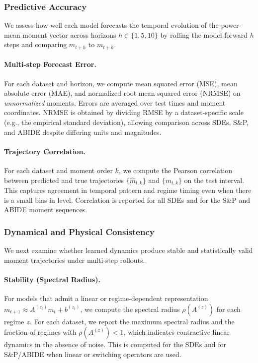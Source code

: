 \documentclass[journal, onecolumn]{IEEEtran}
\begin{document}
\subsubsection{Predictive Accuracy}

We assess how well each model forecasts the temporal evolution of the
power-mean moment vector across horizons \(h \in \{1,5,10\}\) by rolling the
model forward \(h\) steps and comparing \(\hat m_{t+h}\) to \(m_{t+h}\).

\paragraph{Multi-step Forecast Error.}
For each dataset and horizon, we compute mean squared error (MSE), mean
absolute error (MAE), and normalized root mean squared error (NRMSE) on
\emph{unnormalized} moments. Errors are averaged over test times and moment
coordinates. NRMSE is obtained by dividing RMSE by a dataset-specific scale
(e.g., the empirical standard deviation), allowing comparison across SDEs,
S\&P, and ABIDE despite differing units and magnitudes.

\paragraph{Trajectory Correlation.}
For each dataset and moment order \(k\), we compute the Pearson correlation
between predicted and true trajectories \(\{\hat m_{t,k}\}\) and
\(\{m_{t,k}\}\) on the test interval. This captures agreement in temporal
pattern and regime timing even when there is a small bias in level. Correlation
is reported for all SDEs and for the S\&P and ABIDE moment sequences.

\subsubsection{Dynamical and Physical Consistency}

We next examine whether learned dynamics produce stable and statistically valid
moment trajectories under multi-step rollouts.

\paragraph{Stability (Spectral Radius).}
For models that admit a linear or regime-dependent representation
\(m_{t+1} \approx A^{(z_t)} m_t + b^{(z_t)}\), we compute the spectral radius
\(\rho(A^{(z)})\) for each regime \(z\). For each dataset, we report the
maximum spectral radius and the fraction of regimes with \(\rho(A^{(z)})<1\),
which indicates contractive linear dynamics in the absence of noise. This is
computed for the SDEs and for S\&P/ABIDE when linear or switching operators are
used.
\end{document}

